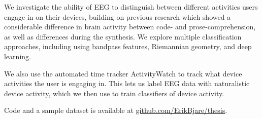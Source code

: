 We investigate the ability of EEG to distinguish between different activities users engage in on their devices, building on previous research which showed a considerable difference in brain activity between code- and prose-comprehension, as well as differences during the synthesis. We explore multiple classification approaches, including using bandpass features, Riemannian geometry, and deep learning.

We also use the automated time tracker ActivityWatch to track what device activities the user is engaging in. This lets us label EEG data with naturalistic device activity, which we then use to train classifiers of device activity.

Code and a sample dataset is available at \href{https://github.com/ErikBjare/thesis}{github.com/ErikBjare/thesis}.
